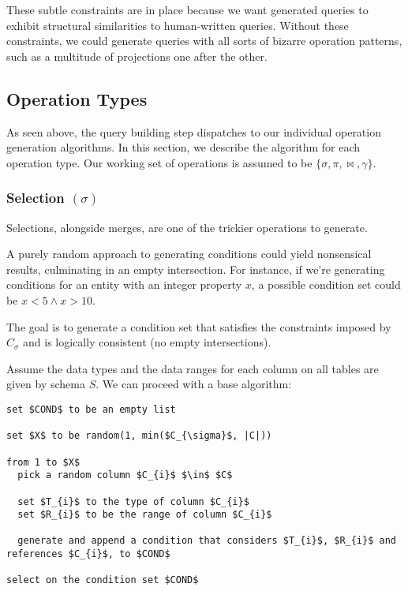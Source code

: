 \documentclass[10pt, twocolumn]{article}
\begin{document}
\noindent
These subtle constraints are in place because we want generated queries to exhibit structural similarities to human-written queries. Without these constraints, we could generate queries with all sorts of bizarre operation patterns, such as a multitude of projections one after the other.

\subsection*{Operation Types}

As seen above, the query building step dispatches to our individual operation generation algorithms. In this section, we describe the algorithm for each operation type. Our working set of operations is assumed to be $\{\sigma, \pi, \bowtie, \gamma\}$.

\subsubsection*{Selection $(\sigma)$}

Selections, alongside merges, are one of the trickier operations to generate.

\spacing
\noindent
A purely random approach to generating conditions could yield nonsensical results, culminating in an empty intersection. For instance, if we're generating conditions for an entity with an integer property $x$, a possible condition set could be $x < 5 \land x > 10$.

\spacing
\noindent
The goal is to generate a condition set that satisfies the constraints imposed by $C_{\sigma}$ and is logically consistent (no empty intersections).

\spacing
\noindent
Assume the data types and the data ranges for each column on all tables are given by schema $S$. We can proceed with a base algorithm:

\spacing
\begin{lstlisting}
set $COND$ to be an empty list

set $X$ to be random(1, min($C_{\sigma}$, |C|))

from 1 to $X$
  pick a random column $C_{i}$ $\in$ $C$

  set $T_{i}$ to the type of column $C_{i}$
  set $R_{i}$ to be the range of column $C_{i}$

  generate and append a condition that considers $T_{i}$, $R_{i}$ and references $C_{i}$, to $COND$

select on the condition set $COND$
\end{lstlisting}
\end{document}
